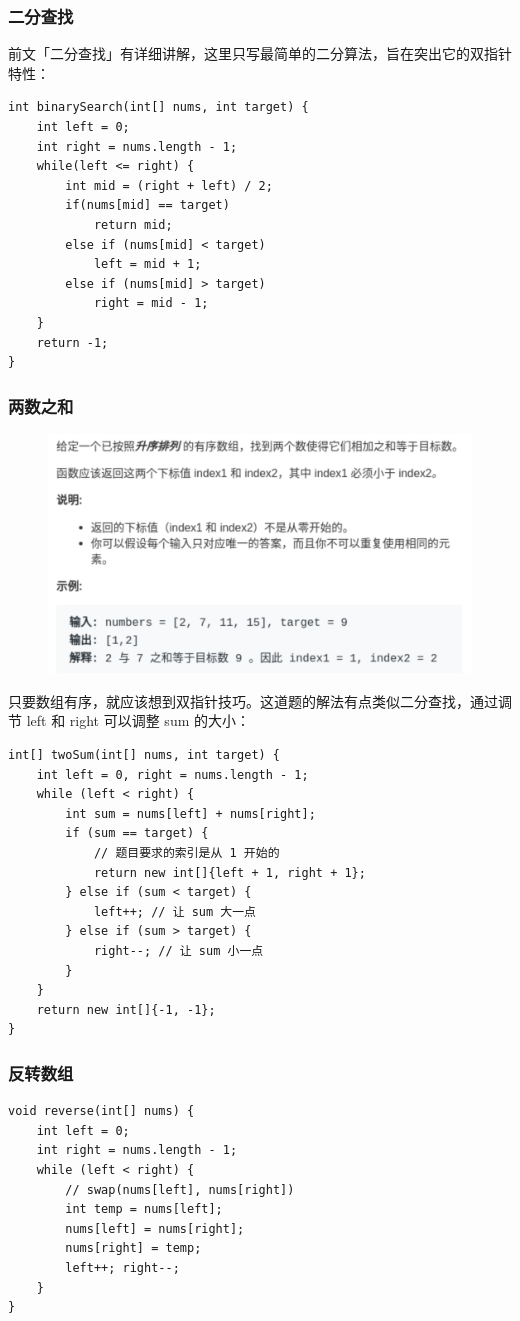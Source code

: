 \documentclass[12pt]{article}
\begin{document}
\subsubsection{二分查找}
前文「二分查找」有详细讲解，这里只写最简单的二分算法，旨在突出它的双指针特性：
\begin{lstlisting}
int binarySearch(int[] nums, int target) {
    int left = 0; 
    int right = nums.length - 1;
    while(left <= right) {
        int mid = (right + left) / 2;
        if(nums[mid] == target)
            return mid; 
        else if (nums[mid] < target)
            left = mid + 1; 
        else if (nums[mid] > target)
            right = mid - 1;
    }
    return -1;
}
\end{lstlisting}

\subsubsection{两数之和}
\begin{figure}[H]
    \centering
    \includegraphics[width=.6\textwidth]{fig/Double_Pointers_5.png}
\end{figure}

只要数组有序，就应该想到双指针技巧。这道题的解法有点类似二分查找，通过调节 left 和 right 可以调整 sum 的大小：
\begin{lstlisting}
int[] twoSum(int[] nums, int target) {
    int left = 0, right = nums.length - 1;
    while (left < right) {
        int sum = nums[left] + nums[right];
        if (sum == target) {
            // 题目要求的索引是从 1 开始的
            return new int[]{left + 1, right + 1};
        } else if (sum < target) {
            left++; // 让 sum 大一点
        } else if (sum > target) {
            right--; // 让 sum 小一点
        }
    }
    return new int[]{-1, -1};
}
\end{lstlisting}

\subsubsection{反转数组}
\begin{lstlisting}
void reverse(int[] nums) {
    int left = 0;
    int right = nums.length - 1;
    while (left < right) {
        // swap(nums[left], nums[right])
        int temp = nums[left];
        nums[left] = nums[right];
        nums[right] = temp;
        left++; right--;
    }
}
\end{lstlisting}
\end{document}

